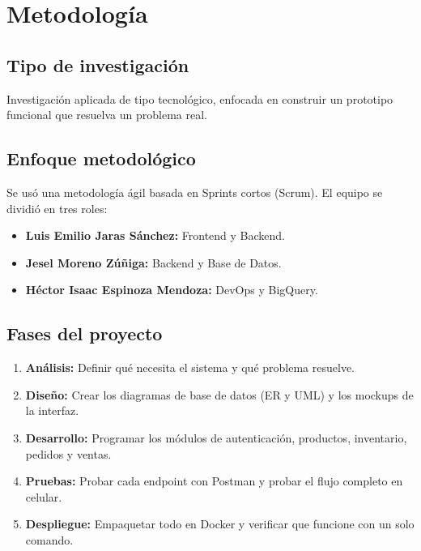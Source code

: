 \documentclass[12pt, a4paper]{article}
\begin{document}
\section{Metodología}

\subsection{Tipo de investigación}
Investigación aplicada de tipo tecnológico, enfocada en construir un prototipo funcional que resuelva un problema real.

\subsection{Enfoque metodológico}
Se usó una metodología ágil basada en Sprints cortos (Scrum). El equipo se dividió en tres roles:
\begin{itemize}
    \item \textbf{Luis Emilio Jaras Sánchez:} Frontend y Backend.
    \item \textbf{Jesel Moreno Zúñiga:} Backend y Base de Datos.
    \item \textbf{Héctor Isaac Espinoza Mendoza:} DevOps y BigQuery.
\end{itemize}

\subsection{Fases del proyecto}
\begin{enumerate}
    \item \textbf{Análisis:} Definir qué necesita el sistema y qué problema resuelve.
    \item \textbf{Diseño:} Crear los diagramas de base de datos (ER y UML) y los mockups de la interfaz.
    \item \textbf{Desarrollo:} Programar los módulos de autenticación, productos, inventario, pedidos y ventas.
    \item \textbf{Pruebas:} Probar cada endpoint con Postman y probar el flujo completo en celular.
    \item \textbf{Despliegue:} Empaquetar todo en Docker y verificar que funcione con un solo comando.
\end{enumerate}
\end{document}
